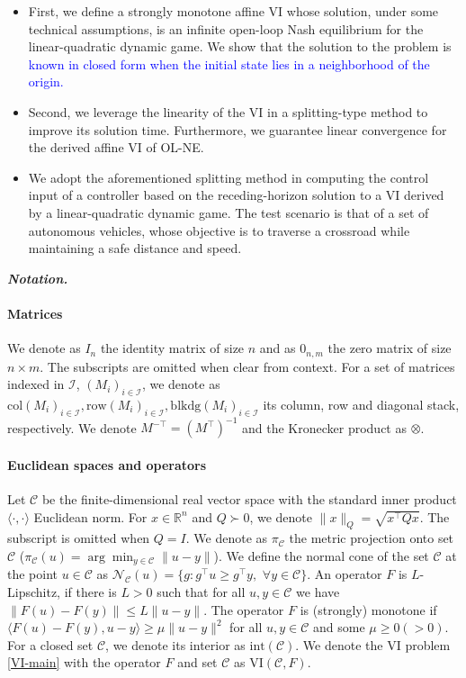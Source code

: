 \documentclass[letterpaper, 10 pt, conference]{ieeeconf}  %
\newcommand{\edit}[1]{\textcolor{blue}{#1}}
\newcommand{\R}{\mathbb{R}}
\newcommand{\mc}{\mathcal}
\newcommand{\col}{\mathrm{col}}
\newcommand{\blkdiag}{\mathrm{blkdg}}
\newcommand{\row}{\mathrm{row}}
\begin{document}
\begin{itemize}
   \item {First, we define a strongly monotone affine VI whose solution, under some technical assumptions, is an infinite open-loop Nash equilibrium for the linear-quadratic dynamic game. We show that the solution to the problem is \edit{known in closed form when the initial state lies in a neighborhood of the origin.}}
   \item Second, we leverage the linearity of the VI in a splitting-type method to improve its solution time. Furthermore, we guarantee linear convergence for the derived affine VI of OL-NE. 
   \item We adopt the aforementioned splitting method in computing the control input of a controller based on the receding-horizon solution to a VI derived by a linear-quadratic dynamic game. The test scenario is that of a set of autonomous vehicles, whose objective is to traverse a crossroad while maintaining a safe distance and speed.
\end{itemize}

\textit{\textbf{Notation.}} 
\paragraph{Matrices} We denote as $I_n$ the identity matrix of size $n$ and as $0_{n,m}$ the zero matrix of size $n\times m$.  The subscripts are omitted when clear from context.  For a set of matrices indexed in $\mc I$, $(M_i)_{i\in\mc I}$, we denote as $\col(M_i)_{i\in\mc I}, \row(M_i)_{i\in\mc I}, \blkdiag(M_i)_{i\in\mc I} $ its column, row and diagonal stack, respectively. We denote $M^{-\top}=(M^{\top})^{-1}$ and the Kronecker product as $\otimes$.
\paragraph{Euclidean spaces and operators} Let $\mathcal{C}$ be the finite-dimensional real vector space with the standard inner product $\langle \cdot, \cdot \rangle$ Euclidean norm.  For $x\in\R^n$ and $Q\succ 0$, we denote $\|x\|_{Q} = \sqrt{x^{\top}Qx}$. The subscript is omitted when $Q=I$. We denote as $\pi_{\mathcal{C}}$ the metric projection onto set $\mathcal{C}$ ($\pi_{\mathcal{C}}(u) = \arg\min_{y \in \mathcal{C}} \|u - y\|$).  We define the normal cone of the set \( \mathcal{C} \) at the point \( u \in  \mathcal{C} \) as $\mathcal{N}_{\mathcal{C}} (u) = \{ g : g^\top u \geq g^\top y, \,\,  \forall y \in \mathcal{C} \}$. An operator $F$ is $L$-Lipschitz, if there is $L>0$ such that for all $u,y \in \mathcal{C}$ we have $\|F(u) - F(y)\| \leq L\|u-y\|$. The operator $F$ is (strongly) monotone if $\langle F(u) - F(y), u - y \rangle \geq  \mu \|u-y\|^2$ for all $u,y \in \mathcal{C}$ and some $\mu \geq 0 (>0)$. For a closed set $\mc C$, we denote its interior as $\mathrm{int}(\mc C)$. {We denote the VI problem \ref{VI-main} with the operator \( F \) and set \( \mathcal{C} \) as \( \mathrm{VI}(\mathcal{C}, F) \).}
\end{document}
